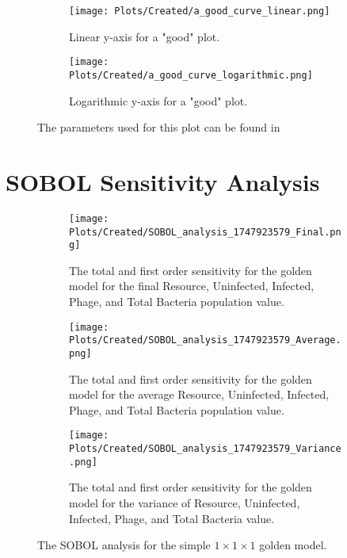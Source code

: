 \begin{figure}[h!]
    \centering
    \begin{subfigure}{1\linewidth}
        \centering
        \texttt{[image: Plots/Created/a\_good\_curve\_linear.png]}
        \caption{
            Linear y-axis for a "good" plot. 
        }
        \label{fig:created:a_good_curve_linear}
    \end{subfigure}
    \hfill
    \begin{subfigure}{1\linewidth}
        \centering
        \texttt{[image: Plots/Created/a\_good\_curve\_logarithmic.png]}
        \caption{
            Logarithmic y-axis for a "good" plot. 
        }
        \label{fig:created:a_good_curve_logarithmic}
    \end{subfigure}
    \label{fig:created:a_good_curve}
    \caption{The parameters used for this plot can be found in }
\end{figure}



\section{SOBOL Sensitivity Analysis}
\begin{figure}[h!]
    \centering
    \begin{subfigure}{0.49\linewidth}
        \centering
        \texttt{[image: Plots/Created/SOBOL\_analysis\_1747923579\_Final.png]}
        \caption{
            The total and first order sensitivity for the golden model for the final Resource, Uninfected, Infected, Phage, and Total Bacteria population value. 
        }
        \label{fig:created:SOBOL_final}
    \end{subfigure}
    \hfill
    \begin{subfigure}{0.49\linewidth}
        \centering
        \texttt{[image: Plots/Created/SOBOL\_analysis\_1747923579\_Average.png]}
        \caption{
            The total and first order sensitivity for the golden model for the average Resource, Uninfected, Infected, Phage, and Total Bacteria population value. 
        }
        \label{fig:created:SOBOL_average}
    \end{subfigure}
    \hfill
    \begin{subfigure}{0.49\linewidth}
        \centering
        \texttt{[image: Plots/Created/SOBOL\_analysis\_1747923579\_Variance.png]}
        \caption{
            The total and first order sensitivity for the golden model for the variance of Resource, Uninfected, Infected, Phage, and Total Bacteria value. 
        }
        \label{fig:created:SOBOL_variance}
    \end{subfigure}
    \caption{The SOBOL analysis for the simple $1\times 1 \times 1$ golden model. }
\end{figure}
